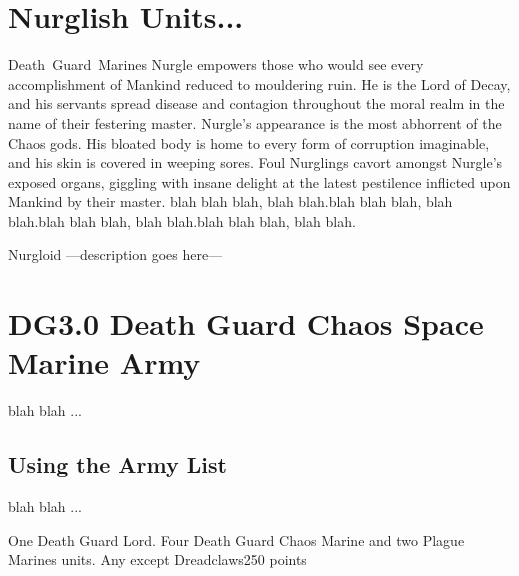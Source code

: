 \documentclass[a4paper]{article}
\begin{document}
 
%
\pagebreak
\section*{Nurglish Units...}

\unit{Death Guard Marines}{
	Nurgle empowers those who would see every accomplishment of Mankind reduced to mouldering ruin.
	He is the Lord of Decay, and his servants spread disease and contagion throughout the moral realm in the name of their festering master.
	Nurgle’s appearance is the most abhorrent of the Chaos gods. His bloated body is home to every form of corruption imaginable, and his skin is covered in weeping sores.
	Foul Nurglings cavort amongst Nurgle’s exposed organs, giggling with insane delight at the latest pestilence inflicted upon Mankind by their master.
	blah blah blah, blah blah.blah blah blah, blah blah.blah blah blah, blah blah.blah blah blah, blah blah.
}
\statsEND


\unit{Nurgloid} {							%
	---description goes here---
}
\statsEND									%

%
\pagebreak
\section*{DG3.0 Death Guard Chaos Space Marine Army}
blah blah ...
\subsection{Using the Army List}
blah blah ...

		{One Death Guard Lord. Four Death Guard Chaos Marine and two Plague Marines units.}
		{Any except Dreadclaws}{250 points}
\formationsEND
\end{document}
